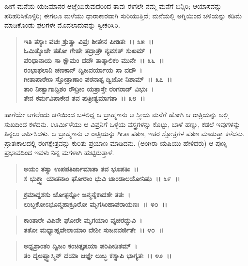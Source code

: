 ಹೀಗೆ ಮನೆಯ ಯಜಮಾನರ ಆಜ್ಞೆಯಿರುವುದರಿಂದ ತಾವು ಈಗಲೇ ನಮ್ಮ ಮನೆಗೆ ಬನ್ನಿರಿ; ಆಯಾಸವನ್ನು ಪರಿಹರಿಸಿಕೊಳ್ಳಿರಿ; ಈಗಲೂ ಮಳೆಯು ಧಾರಾಕಾರವಾಗಿ ಸುರಿಯು\-ತ್ತಿದೆ; ಮನೆಯಲ್ಲಿ ಅಗ್ನಿಯಿಂದ ಚಳಿಯನ್ನು ಕಡಿಮೆ ಮಾಡಿಕೊಂಡು ಫಲಗಳೇ ಮೊದಲಾದುವನ್ನು ಸ್ವೀಕರಿಸಿರಿ.

\begin{verse}
\textbf{ಇತಿ ತಸ್ಯಾಃ ವಚಃ ಶ್ರುತ್ವಾ ವಿಪ್ರಃ ಶೀತೇನ ಪೀಡಿತಃ~।। ೩೫~।।}\\\textbf{ಓಮಿತ್ಯೊಚೇ ತತೋ ಗೇಹೇ ತದ್ರಾತ್ರೌ ನ್ಯವಸತ್ ಸುಖಮ್~। }\\\textbf{ಪರಿಧಾನಾಯ ಸಾ ಕ್ಷೌಮಂ ದದೌ ತಾತ್ಕಾಲಿಕಂ ಮುನೇ~।। ೩೬~।।}\\\textbf{ರಂಭಾಫಲಾನಿ ಚಣಕಾನ್ ದ್ವಿಜವರ್ಯಾಯ ಸಾ ದದೌ~। }\\\textbf{ಗೀತಾಪಾಠೇಣ ಸ್ತೋತ್ರಾಣಾಂ ಪಠನಾತ್ಸ ದ್ವಿಜೋ ನಿಶಾಮ್~।। ೩೭~।।} \\\textbf{ತಾಂ ನೀತ್ವಾಗಾದ್ದಿಶಂ ರೌದ್ರೀಂ ಯತ್ರಾಸ್ತೇ ರಂಗರಾಡ್ ವಿಭುಃ~। }\\\textbf{ತೇನ ಕರ್ಮವಿಪಾಕೇನ ತವ ಪುತ್ರೀತ್ವಮಾಗತಾ~।। ೩೮~।।}
\end{verse}

ಹಾಗೆಯೇ ಆಗಲೆಂದು ಚಳಿಯಿಂದ ಬಳಲಿದ್ದ ಆ ಬ್ರಾಹ್ಮಣನು ಆ ಸ್ತ್ರೀಯ ಮನೆಗೆ ಹೋಗಿ ಆ ರಾತ್ರಿಯನ್ನು ಅಲ್ಲಿ ಸುಖದಿಂದ ಕಳೆದನು. ಊರ್ಮಿಳೆಯು ಆ ವಿಪ್ರನಿಗೆ ಒಳ್ಳೆಯ ವಸ್ತ್ರಗಳನ್ನು ಕೊಟ್ಟು, ಬಾಳೆ ಹಣ್ಣು, ಕಡಲೆ ಇವುಗಳನ್ನು ತಿನ್ನಲು ಅರ್ಪಿಸಿದಳು. ಆ ಬ್ರಾಹ್ಮಣನು ಆ ರಾತ್ರಿಯನ್ನು ಗೀತಾ ಪಠಣ, ಇತರ ಸ್ತೋತ್ರಗಳ ಪಠಣ ಮಾಡುತ್ತಾ ಕಳೆದನು. ಪ್ರಾತಃಕಾಲದಲ್ಲಿ ರಂಗಕ್ಷೇತ್ರವನ್ನು ಕುರಿತು ಪ್ರಯಾಣ ಮಾಡಿದನು. (ಅಂಗಿರಾ ಋಷಿಯು ಹೇಳಿದರು) ಆ ಪುಣ್ಯ ಪ್ರಭಾವದಿಂದ ಇವಳು ನಿನ್ನ ಮಗಳಾಗಿ ಹುಟ್ಟಿರುತ್ತಾಳೆ.

\begin{verse}
\textbf{ಅಯಂ ತಸ್ಯಾ ಉಪಪತಿರ್ಜಾಮಾತಾ ತವ ಭೂಪತಿಃ~।।}\\\textbf{ಸ ಭುಕ್ತ್ವಾ ಯಾತನಾಂ ಘೋರಾಂ ಭುವಿ ಚಾಂಡಾಲಯೋನಿಷು~।। ೩೯~।।}
\end{verse}

\begin{verse}
\textbf{ಕ್ರಮಾದ್ದಶಸು ಚೋತ್ಪನ್ನೋ ಜನ್ಮನೈಕಾದಶೇ ತತಃ~।}\\\textbf{ಲುಬ್ದಕೋಽಭೂನ್ಮಹಾಕ್ರೂರೋ ಮೃಗಸಿಂಹಾಪರಾಯಣಃ~।। ೪೦~।। }
\end{verse}

\begin{verse}
\textbf{ಕಾಂತಾರೇ ವಿಪಿನೇ ಘೋರೇ ಮೃಗಯಾಂ ವ್ಯಚರದ್ಭುವಿ~।}\\\textbf{ತತೋ ಮಧ್ಯಾಹ್ನವೇಲಾಯಾಂ ದೇಶೀ ಸುಜನವರ್ಜಿತೇ~।। ೪೦~।। }
\end{verse}

\begin{verse}
\textbf{ಅಧ್ವಶ್ರಾಂತಂ ದ್ವಿಜಂ ಕಂಚಿತ್ತೃಷಯಾ ಪರಿಪೀಡಿತಮ್~।}\\\textbf{ತಂ ದೃಅಷ್ಟ್ವಾಸ್ಮಿನ್ ದಯಾ ಜಜ್ಞೇ ಲುಬ್ಧ ಕಸ್ಯಾಪಿ ಭಾಗ್ಯತಃ~।। ೪೨~।।}
\end{verse}

